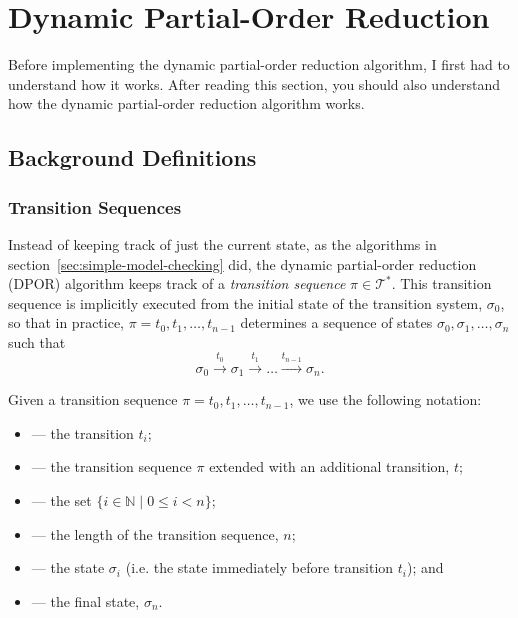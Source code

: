 \documentclass[12pt,a4paper,twoside,openright]{report}
\begin{document}
\section{Dynamic Partial-Order Reduction}
\label{sec:dpor-prep}
Before implementing the dynamic partial-order
reduction algorithm, I first had to
understand how it works.
After reading this section, you should
also understand how the dynamic
partial-order reduction algorithm works.

\subsection{Background Definitions}

\subsubsection{Transition Sequences}
Instead of keeping track of just the current state, as
the algorithms in section~\ref{sec:simple-model-checking}
did, the dynamic partial-order reduction (DPOR) algorithm
keeps track of a \emph{transition
sequence} $\pi \in \mathcal{T}^*$. This transition
sequence is implicitly executed from the initial state of
the transition system, $\sigma_0$, so that in practice,
$\pi = t_0, t_1, \ldots, t_{n-1}$ determines a sequence of states
$\sigma_0, \sigma_1, \ldots, \sigma_n$ such that
\[
	\sigma_0 \xrightarrow{\ t_0\ } \sigma_1 \xrightarrow{\ t_1\ }
	\ldots \xrightarrow{t_{n-1}} \sigma_n.
\]

Given a transition sequence $\pi = t_0, t_1, \ldots, t_{n-1}$,
we use the following notation:
\begin{itemize}[label={}]
	\newcommand{\defsindent}{3.5em}
	\item{\makebox[\defsindent]{\hfill$\pi_i$}
		--- the transition $t_i$;}
	\item{\makebox[\defsindent]{\hfill$\pi.t$}
		--- the transition sequence $\pi$ extended with
		an additional transition, $t$;}
	\item{\makebox[\defsindent]{\hfill$\textit{dom}(\pi)$}
		--- the set $\{i \in \mathbb{N} \mid 0 \leq i < n \}$;}
	\item{\makebox[\defsindent]{\hfill$|\pi|$}
		--- the length of the transition sequence, $n$;}
	\item{\makebox[\defsindent]{\hfill$\textit{pre}(\pi, i)$}
		--- the state $\sigma_i$ (i.e. the
		state immediately before transition $t_i$); and}
	\item{\makebox[\defsindent]{\hfill$\textit{last}(\pi)$}
		--- the final state, $\sigma_n$.}
\end{itemize}
\end{document}
